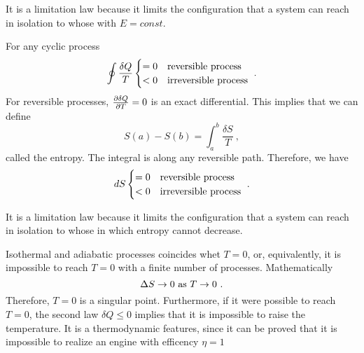     It is a limitation law because it limits the configuration that a system can reach in isolation to whose with $E = const$. 

    \begin{law}[2nd]
        For any cyclic process
        \begin{equation*}
            \oint \frac{\delta Q}{T} \begin{cases}
                = 0 & \textnormal{reversible process} \\
                < 0 & \textnormal{irreversible process} \\
            \end{cases} ~.
        \end{equation*}
        For reversible processes, $\frac{\partial\delta Q}{\partial T} = 0$ is an exact differential. This implies that we can define 
        \begin{equation*}
            S(a) - S(b) = \int_a^b \frac{\delta S}{T} ~,
        \end{equation*}
        called the entropy. The integral is along any reversible path. Therefore, we have  
        \begin{equation}\label{second}
            dS \begin{cases}
                = 0 & \textnormal{reversible process} \\
                < 0 & \textnormal{irreversible process} \\
            \end{cases} ~.
        \end{equation}
    \end{law}

    It is a limitation law because it limits the configuration that a system can reach in isolation to whose in which entropy cannot decrease. 

    \begin{law}[3rd]
        Isothermal and adiabatic processes coincides whet $T=0$, or, equivalently, it is impossible to reach $T=0$ with a finite number of processes. Mathematically 
        \begin{equation*}
        \Delta S \rightarrow 0 ~\textnormal{as}~ T \rightarrow 0 ~.
        \end{equation*}
        Therefore, $T=0$ is a singular point. Furthermore, if it were possible to reach $T=0$, the second law $\delta Q \leq 0$ implies that it is impossible to raise the temperature. It is a thermodynamic features, since it can be proved that it is impossible to realize an engine with efficency $\eta = 1$
    \end{law}

